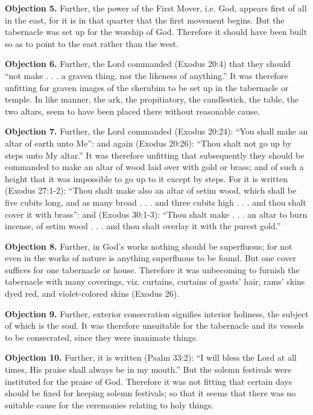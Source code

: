 \textbf{Objection 5.} Further, the power of the First Mover, i.e. God, appears first of all in the east, for it is in that quarter that the first movement begins. But the tabernacle was set up for the worship of God. Therefore it should have been built so as to point to the east rather than the west.

\textbf{Objection 6.} Further, the Lord commanded (Exodus 20:4) that they should ``not make . . . a graven thing, nor the likeness of anything.'' It was therefore unfitting for graven images of the cherubim to be set up in the tabernacle or temple. In like manner, the ark, the propitiatory, the candlestick, the table, the two altars, seem to have been placed there without reasonable cause.

\textbf{Objection 7.} Further, the Lord commanded (Exodus 20:24): ``You shall make an altar of earth unto Me'': and again (Exodus 20:26): ``Thou shalt not go up by steps unto My altar.'' It was therefore unfitting that subsequently they should be commanded to make an altar of wood laid over with gold or brass; and of such a height that it was impossible to go up to it except by steps. For it is written (Exodus 27:1-2): ``Thou shalt make also an altar of setim wood, which shall be five cubits long, and as many broad . . . and three cubits high . . . and thou shalt cover it with brass'': and (Exodus 30:1-3): ``Thou shalt make . . . an altar to burn incense, of setim wood . . . and thou shalt overlay it with the purest gold.''

\textbf{Objection 8.} Further, in God's works nothing should be superfluous; for not even in the works of nature is anything superfluous to be found. But one cover suffices for one tabernacle or house. Therefore it was unbecoming to furnish the tabernacle with many coverings, viz. curtains, curtains of goats' hair, rams' skins dyed red, and violet-colored skins (Exodus 26).

\textbf{Objection 9.} Further, exterior consecration signifies interior holiness, the subject of which is the soul. It was therefore unsuitable for the tabernacle and its vessels to be consecrated, since they were inanimate things.

\textbf{Objection 10.} Further, it is written (Psalm 33:2): ``I will bless the Lord at all times, His praise shall always be in my mouth.'' But the solemn festivals were instituted for the praise of God. Therefore it was not fitting that certain days should be fixed for keeping solemn festivals; so that it seems that there was no suitable cause for the ceremonies relating to holy things.

